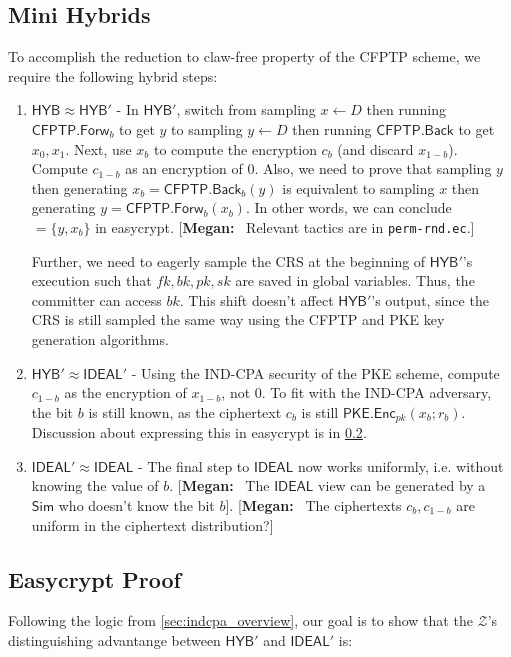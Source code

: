 \documentclass{article}[12pt]
\newcommand{\authnote}[2]{[{\color{red}\textbf{#1:}}~{\color{blue} #2}]}
\newcommand{\authnote}[2]{}
\newcommand{\megan}[1]{\authnote{Megan}{#1}}
\newcommand{\code}[1]{\texttt{#1}} %
\newcommand{\PKE}{\mathsf{PKE}}
\newcommand{\Enc}{\mathsf{Enc}}
\newcommand{\EncKey}{{pk}}
\newcommand{\DecKey}{{sk}}
\newcommand{\CFPTP}{\mathsf{CFPTP}}
\newcommand{\Forw}{\mathsf{Forw}}
\newcommand{\Back}{\mathsf{Back}}
\newcommand{\ForwKey}{{fk}}
\newcommand{\BackKey}{{bk}}
\newcommand{\Domain}{D}
\newcommand{\Simulator}{{\mathsf{Sim}}} %
\newcommand{\Environment}{{\mathcal{Z}}} %
\newcommand{\Ideal}{{\mathsf{IDEAL}}}
\newcommand{\Hyb}{{\mathsf{HYB}}}
\begin{document}
\subsection{Mini Hybrids}
To accomplish the reduction to claw-free property of the CFPTP scheme, we require the following hybrid steps:
\begin{enumerate}
	\item\label{hyb:2.1} $\Hyb \approx \Hyb'$ - In $\Hyb'$, switch from sampling $x\gets \Domain$ then running $\CFPTP.\Forw_b$ to get $y$ to sampling $y \gets \Domain$ then running $\CFPTP.\Back$ to get $x_0,x_1$. Next, use $x_b$ to compute the encryption $c_b$ (and discard $x_{1-b}$). Compute $c_{1-b}$ as an encryption of $0$.
	Also, we need to prove that sampling $y$ then generating $x_b = \CFPTP.\Back_b(y)$ is equivalent to sampling $x$ then generating $y = \CFPTP.\Forw_b(x_b)$. In other words, we can conclude ${=\{y, x_b\}}$ in easycrypt. \megan{Relevant tactics are in \code{perm-rnd.ec}.}

	Further, we need to eagerly sample the CRS at the beginning of $\Hyb'$'s execution such that $\ForwKey, \BackKey, \EncKey, \DecKey$ are saved in global variables. Thus, the committer can access $\BackKey$. This shift doesn't affect $\Hyb'$'s output, since the CRS is still sampled the same way using the CFPTP and PKE key generation algorithms.

	\item\label{hyb:2.2} $\Hyb' \approx \Ideal'$ - Using the IND-CPA security of the PKE scheme, compute $c_{1-b}$ as the encryption of $x_{1-b}$, not $0$. To fit with the IND-CPA adversary, the bit $b$ is still known, as the ciphertext $c_b$ is still $\PKE.\Enc_{\EncKey}(x_b; r_b)$. Discussion about expressing this in easycrypt is in \cref{sec:indcpa_easycrypt}.

	\item\label{hyb:2.3} $\Ideal' \approx \Ideal$ - The final step to $\Ideal$ now works uniformly, i.e. without knowing the value of $b$. \megan{The $\Ideal$ view can be generated by a $\Simulator$ who doesn't know the bit $b$}. \megan{The ciphertexts $c_b, c_{1-b}$ are uniform in the ciphertext distribution?}
\end{enumerate}

\subsection{Easycrypt Proof}\label{sec:indcpa_easycrypt}
Following the logic from \cref{sec:indcpa_overview}, our goal is to show that the $\Environment$'s distinguishing advantange between $\Hyb'$ and $\Ideal'$ is:
\end{document}
